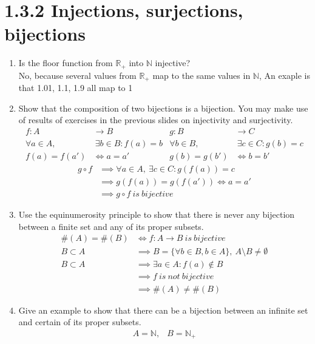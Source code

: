 \documentclass{article}
\begin{document}
\section*{1.3.2 Injections, surjections, bijections}
\begin{enumerate}
    \item Is the floor function from $\mathbb{R}_{+}$ into $\mathbb{N}$ injective?\\
    No, because several values from $\mathbb{R}_{+}$ map to the same values in $\mathbb{N}$, An exaple is that 1.01, 1.1, 1.9 all map to 1
    \item Show that the composition of two bijections is a bijection. You may make use of results of exercises in the previous slides on injectivity and surjectivity.
    \begin{align*}
        f: A &\rightarrow B & g: B &\rightarrow C\\
        \forall a \in A,&\ \exists b \in B: f(a) = b & \forall b \in B,&\ \exists c \in C: g(b) = c\\
        f(a) = f(a') &\iff a = a' & g(b) = g(b') &\iff b = b'
    \end{align*}
    \begin{align*}
        g \circ f &\implies \forall a \in A,\ \exists c \in C: g(f(a)) = c\\
        &\implies g(f(a)) = g(f(a')) \iff a = a'\\
        &\implies g \circ f\ is\ bijective
    \end{align*}
    \item Use the equinumerosity principle to show that there is never any bijection between a finite set and any of its proper subsets.
    \begin{align*}
        \#(A) = \#(B) &\iff f: A \rightarrow B\ is\ bijective\\
        B \subset A &\implies B = \{\forall b \in B, b \in A \},\ A \setminus B \neq \emptyset\\
        B \subset A &\implies \exists a \in A: f(a) \notin B\\
        &\implies f\ is\ not\ bijective\\
        &\implies \#(A) \neq \#(B)
    \end{align*}
    \item Give an example to show that there can be a bijection between an infinite set and certain of its proper subsets.
    \begin{align*}
        A = \mathbb{N}, &B = \mathbb{N}_{+}\\

\end{align*}
\end{enumerate}
\end{document}
